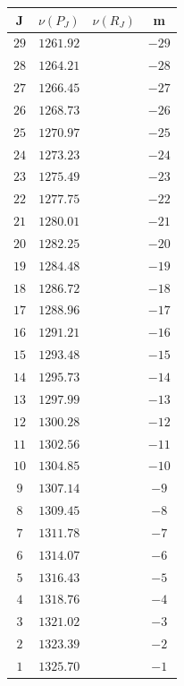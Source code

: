 \documentclass[14pt]{extarticle}
\newcommand{\lb}{\left(}
\newcommand{\rb}{\right)}
\begin{document}
\begin{table}[t]
	\begin{minipage}{0.4\textwidth}
		\centering
		\begin{tabular}{|c|c|c|c|}
			\hline
			J & $\nu \lb P_J \rb$ & $\nu \lb R_J \rb$ & m \\
			\hline
			$29$ & $1261.92$ & & $-29$ \\
			$28$ & $1264.21$ & & $-28$ \\
			$27$ & $1266.45$ & & $-27$ \\
			$26$ & $1268.73$ & & $-26$ \\
			$25$ & $1270.97$ & & $-25$ \\
			$24$ & $1273.23$ & & $-24$ \\
			$23$ & $1275.49$ & & $-23$ \\
			$22$ & $1277.75$ & & $-22$ \\
			$21$ & $1280.01$ & & $-21$ \\
			$20$ & $1282.25$ & & $-20$ \\
			$19$ & $1284.48$ & & $-19$ \\
			$18$ & $1286.72$ & & $-18$ \\
			$17$ & $1288.96$ & & $-17$ \\
			$16$ & $1291.21$ & & $-16$ \\
			$15$ & $1293.48$ & & $-15$ \\
			$14$ & $1295.73$ & & $-14$ \\
			$13$ & $1297.99$ & & $-13$ \\
			$12$ & $1300.28$ & & $-12$ \\
			$11$ & $1302.56$ & & $-11$ \\
			$10$ & $1304.85$ & & $-10$ \\
			$9$ & $1307.14$ & & $-9$ \\
			$8$ & $1309.45$ & & $-8$ \\
			$7$ & $1311.78$ & & $-7$ \\
			$6$ & $1314.07$ & & $-6$ \\
			$5$ & $1316.43$ & & $-5$ \\
			$4$ & $1318.76$ & & $-4$ \\
			$3$ & $1321.02$ & & $-3$ \\
			$2$ & $1323.39$ & & $-2$ \\
			$1$ & $1325.70$ & & $-1$ \\
			\hline
		\end{tabular}
	\end{minipage}
	\begin{minipage}{0.3\linewidth}

\end{minipage}
\end{table}
\end{document}
